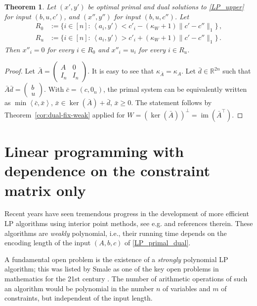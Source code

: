 \documentclass[11pt, a4paper]{article}
\newcommand{\pr}[2]{\left\langle #1, #2 \right\rangle}
\newcommand{\1}{\mathbbm{1}}
\newtheorem{theorem}{Theorem}[section]
\theoremstyle{case}
\newcommand{\R}{\mathbb{R}}
\begin{document}
        \begin{theorem}\label{thm:primal-fixing-upper}
        Let $(x',y')$ be optimal primal and dual solutions to \eqref{LP_upper} for input $(b,u,c')$, and $(x'',y'')$ for input $(b,u,c'')$. Let
        \[
        \begin{aligned}
                R_0&:=\{i\in [n]:\,  \pr{a_i}{y'}< c'_i- (\kappa_W + 1)\|c'-c''\|_1\}\, ,\\
        R_u&:=\{i\in [n]:\,  \pr{a_i}{y'}> c'_i+ (\kappa_W + 1)\|c'-c''\|_1\}\, .
        \end{aligned}
        \]
         Then $x''_i=0$ for every $i\in R_0$ and $x''_i=u_i$ for every $i\in R_u$.
    \end{theorem}
    \begin{proof}
    Let $\bar A=\begin{pmatrix}A & 0\\ I_n & I_n\end{pmatrix}$. It is easy to see that $\kappa_{\bar A}=\kappa_A$. 
Let $\bar d\in \R^{2n}$ such that $\bar A\bar d=\begin{pmatrix} b\\ u\end{pmatrix}$.
    With $\bar c=(c,0_n)$,
    the primal system can be equivalently written as 
    $\min \pr{\bar c}{\bar x}$, $\bar x\in \ker(\bar A)+\bar d$, $\bar x\ge 0$. The statement follows by Theorem~\ref{cor:dual-fix-weak} applied for $W=(\ker(\bar A))^\perp=\operatorname{im}(\bar A^\top)$.
    \end{proof}

\section{Linear programming with dependence on the constraint matrix only}\label{sec:only-A}

Recent years have seen tremendous progress in the development of more efficient 
LP algorithms using interior point methods, see e.g. \cite{CLS19,LS19,Brand2020,Brand2021} and references therein. These algorithms are \emph{weakly} polynomial, i.e., their running time depends on the encoding length of the input $(A,b,c)$ of \ref{LP_primal_dual}.

A fundamental open problem is the existence of a \emph{strongly} polynomial LP algorithm; this was listed by Smale as one of the key open problems  in mathematics for the 21st century \cite{Smale98}. The number of arithmetic operations of such an algorithm would be polynomial in the number $n$ of variables  and $m$ of constraints, but independent of the input length.
\end{document}
